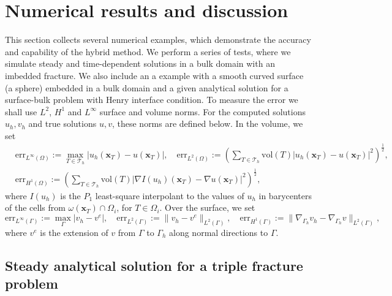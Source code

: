 \documentclass{article}
\newcommand{\bx}{\mathbf x}
\newcommand{\T}{\mathcal T}
\begin{document}
\section{Numerical results and discussion}\label{s_numer}
This section collects several numerical examples, which demonstrate the accuracy and capability of the hybrid method.
 We perform a series of tests, where we simulate steady and time-dependent solutions  in a bulk domain with an imbedded  fracture. {We also include an a example with a smooth curved surface (a sphere) embedded in a bulk domain and a given analytical solution for a surface-bulk problem with Henry interface condition.} %
 {To measure the error we shall use $L^2$, $H^1$ and $L^\infty$ surface and volume norms.
For the computed solutions $u_h,v_h$ and true solutions $u,v$, these norms are defined below. In the volume, we set
\[
\begin{split}
&\mbox{err}_{L^\infty(\Omega)}:=\max_{T\in\T_h}|u_h(\bx_T)-u(\bx_T)|,\quad \mbox{err}_{L^2(\Omega)}:=\left(\sum_{T\in\T_h}\text{vol}(T)|u_h(\bx_T)-u(\bx_T)|^2\right)^{\frac12},\\ &\mbox{err}_{H^1(\Omega)}:=\left(\sum_{T\in\T_h}\text{vol}(T)|\nabla I(u_h)(\bx_T)-\nabla u(\bx_T)|^2\right)^{\frac12},
\end{split}
\]
where $I(u_h)$ is the $P_1$ least-square interpolant to the values of $u_h$ in barycenters of the cells from $\omega(\bx_T)\cap\Omega_i$, for $T\in\Omega_i$. Over the surface, we set
\[
\mbox{err}_{L^\infty(\Gamma)}:=\max_{\Gamma}|v_h-v^e|,\quad \mbox{err}_{L^2(\Gamma)}:=\|v_h-v^e\|_{L^2(\Gamma)},\quad
\mbox{err}_{H^1(\Gamma)}:=\|\nabla_{\Gamma_h}v_h-\nabla_{\Gamma_h}v\|_{L^2(\Gamma)},
\]
where $v^e$ is the  extension of $v$ from $\Gamma$ to $\Gamma_h$ along normal directions to $\Gamma$.
}




\subsection{Steady analytical solution for a  triple fracture problem}\label{sec_ex2}
\end{document}
